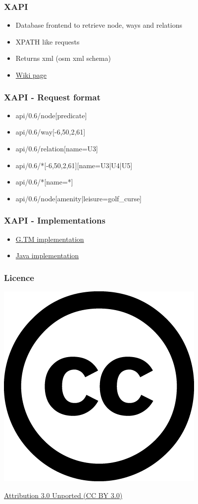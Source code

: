 \documentclass{beamer}
\begin{document}
\begin{frame}[fragile]
    \frametitle{XAPI}
    \begin{itemize}
        \item Database frontend to retrieve node, ways and relations
        \item XPATH like requests
        \item Returns xml (osm xml schema)
        \item \href{http://wiki.openstreetmap.org/wiki/Xapi}{Wiki page}
    \end{itemize}
\end{frame}
\begin{frame}[fragile]
    \frametitle{XAPI - Request format}
    \begin{itemize}
        \item api/0.6/node[predicate]
        \item api/0.6/way[-6,50,2,61]
        \item api/0.6/relation[name=U3]
        \item api/0.6/*[-6,50,2,61][name=U3|U4|U5]
        \item api/0.6/*[name=*]
        \item api/0.6/node[amenity|leisure=golf\_curse]
        \end{itemize}
\end{frame}
\begin{frame}[fragile]
    \frametitle{XAPI - Implementations}
    \begin{itemize}
        \item \href{http://xapi.openstreetmap.org/scripts/}{G.TM implementation}
        \item \href{https://github.com/iandees/xapi-servlet}{Java implementation}
    \end{itemize}
\end{frame}


\begin{frame}[fragile]
    \frametitle{Licence}
    \begin{center}
    \includegraphics[scale=0.25]{./cc.png}
    \end{center}
    \begin{center}
    \href{http://creativecommons.org/licenses/by/3.0/}{Attribution 3.0 Unported (CC BY 3.0)}
    \end{center}
\end{frame}
\end{document}
